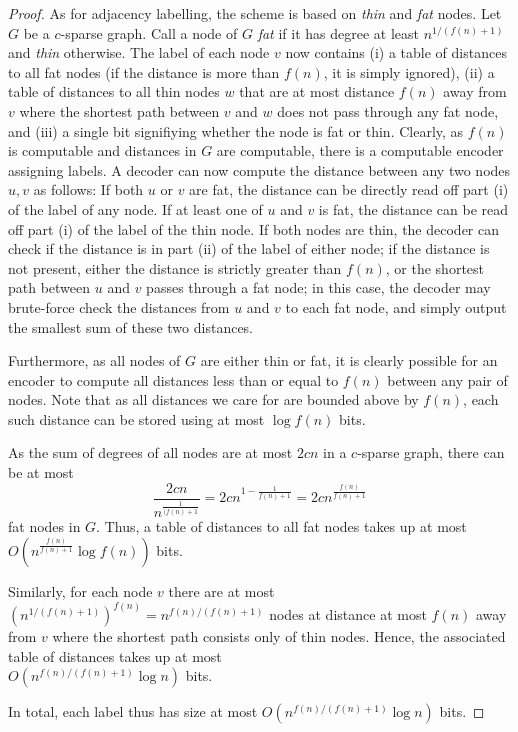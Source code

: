 \begin{proof}
As for adjacency labelling, the scheme is based on \emph{thin} and \emph{fat} nodes. Let $G$ be a $c$-sparse graph. Call
a node of $G$ \emph{fat} if it has degree at least $n^{1/(f(n)+1)}$ and \emph{thin} otherwise.
The label of each node $v$ now contains (i) a table of distances to all fat nodes (if the distance is more than $f(n)$, it is simply ignored), (ii) a table of distances to all thin nodes $w$ that are at most distance $f(n)$ away from $v$
where the shortest path between $v$ and $w$ does not pass through any fat node, and (iii) a single bit signifiying whether the node is fat or thin.
Clearly, as $f(n)$ is computable and distances in $G$ are computable, there is a computable encoder
assigning labels. A decoder can now compute the distance between any two nodes $u,v$ as follows:
If both $u$ or $v$ are fat, the distance can be directly read off part (i) of the label of any node. If at least one of $u$ 
and $v$ is fat, the distance can be read off part (i) of the label of the thin node. If both nodes are thin, the decoder
can check if the distance is in part (ii) of the label of either node; if the distance is not present, 
either the distance is strictly greater than $f(n)$, or the shortest path between $u$ and $v$ passes through
a fat node; in this case, the decoder may brute-force check the distances from $u$ and $v$ to each fat node,
and simply output the smallest sum of these two distances.

Furthermore, as all nodes of $G$ are either thin or fat, it is clearly possible for an encoder to compute
all distances less than or equal to $f(n)$ between any pair of nodes. Note that as all distances we care for 
are bounded above by $f(n)$, each such distance can be stored using at most $\log f(n)$ bits.

As the sum of degrees of all nodes are at most $2cn$ in a $c$-sparse graph, there can be at most
$$
\frac{2cn}{n^{\frac{1}{(f(n)+1}}} = 2cn^{1-\frac{1}{f(n)+1}} = 2cn^{\frac{f(n)}{f(n)+1}}
$$
fat nodes in $G$. Thus, a table of distances to all fat nodes takes up at most $O(n^{\frac{f(n)}{f(n)+1}} \log f(n))$ bits.

Similarly, for each node $v$ there are at most $(n^{1/(f(n)+1)})^{f(n)} = n^{f(n)/(f(n)+1)}$ nodes at distance at most $f(n)$ away from $v$ where the shortest path consists only of thin nodes. Hence, the associated table of distances
takes up at most \\$O(n^{f(n)/(f(n)+1)} \log n)$ bits.

In total, each label thus has size at most $O(n^{f(n)/(f(n)+1)} \log n)$ bits.
\end{proof}


